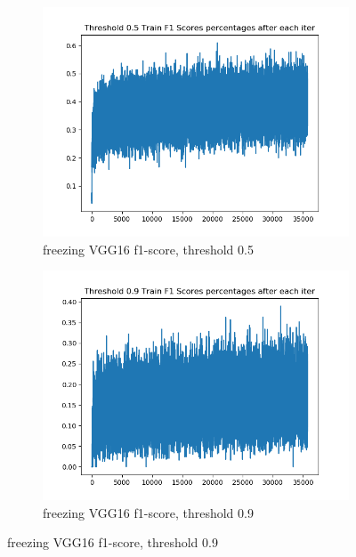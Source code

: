 \begin{figure}[!ht]
\centering
\begin{subfigure}{.5\textwidth}
	\centering
	\includegraphics[width=1\linewidth]{vgg16-0_26-lazy-1-train-scores-f1-5.png}
	\caption{\label{vgg16:vgg16-0_26-lazy-1-train-scores-f1-5}freezing VGG16 f1-score, threshold 0.5}
\end{subfigure}%
\begin{subfigure}{.5\textwidth}
	\centering
	\includegraphics[width=1\linewidth]{vgg16-0_26-lazy-1-train-scores-f1-9.png}
	\caption{\label{vgg16:vgg16-0_26-lazy-1-train-scores-f1-9}freezing VGG16 f1-score, threshold 0.9}
\end{subfigure}
\end{figure}


